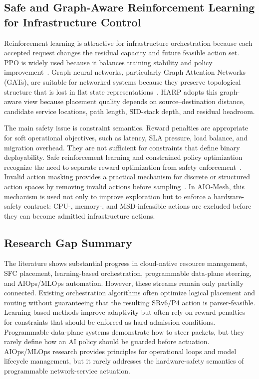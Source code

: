 \documentclass[final,5p]{elsarticle}
\begin{document}
\subsection{Safe and Graph-Aware Reinforcement Learning for Infrastructure Control}
\label{subsec:related_safe_rl}

Reinforcement learning is attractive for infrastructure orchestration because each accepted request changes the residual capacity and future feasible action set. PPO is widely used because it balances training stability and policy improvement~\cite{schulman2017proximal}. Graph neural networks, particularly Graph Attention Networks (GATs), are suitable for networked systems because they preserve topological structure that is lost in flat state representations~\cite{velickovic2018graph}. HARP adopts this graph-aware view because placement quality depends on source--destination distance, candidate service locations, path length, SID-stack depth, and residual headroom.

The main safety issue is constraint semantics. Reward penalties are appropriate for soft operational objectives, such as latency, SLA pressure, load balance, and migration overhead. They are not sufficient for constraints that define binary deployability. Safe reinforcement learning and constrained policy optimization recognize the need to separate reward optimization from safety enforcement~\cite{gu2024safe,ma2022conservative}. Invalid action masking provides a practical mechanism for discrete or structured action spaces by removing invalid actions before sampling~\cite{huang2022closer}. In AIO-Mesh, this mechanism is used not only to improve exploration but to enforce a hardware-safety contract: CPU-, memory-, and MSD-infeasible actions are excluded before they can become admitted infrastructure actions.

\subsection{Research Gap Summary}
\label{subsec:related_gap}
\sloppy
The literature shows substantial progress in cloud-native resource management, SFC placement, learning-based orchestration, programmable data-plane steering, and AIOps/MLOps automation. However, these streams remain only partially connected. Existing orchestration algorithms often optimize logical placement and routing without guaranteeing that the resulting SRv6/P4 action is parser-feasible. Learning-based methods improve adaptivity but often rely on reward penalties for constraints that should be enforced as hard admission conditions. Programmable data-plane systems demonstrate how to steer packets, but they rarely define how an AI policy should be guarded before actuation. AIOps/MLOps research provides principles for operational loops and model lifecycle management, but it rarely addresses the hardware-safety semantics of programmable network-service actuation.
\end{document}

